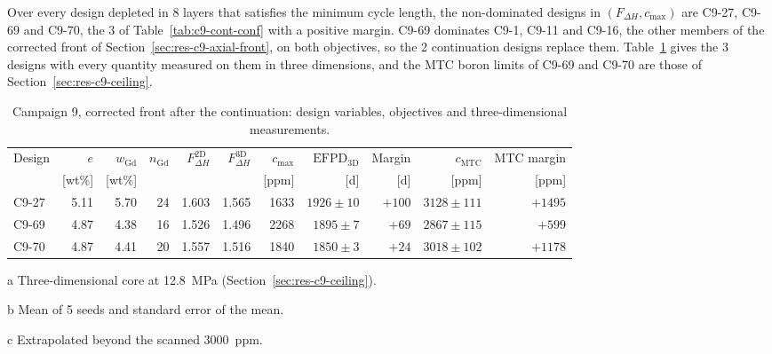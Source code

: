 Over every design depleted in 8 layers that satisfies the minimum cycle
length, the non-dominated designs in $(F_{\Delta H}, c_\mathrm{max})$
are C9-27, C9-69 and C9-70, the 3 of Table~\ref{tab:c9-cont-conf} with
a positive margin. C9-69 dominates C9-1, C9-11 and C9-16, the other
members of the corrected front of Section~\ref{sec:res-c9-axial-front},
on both objectives, so the 2 continuation designs replace them.
Table~\ref{tab:c9-final-front} gives the 3 designs with every quantity
measured on them in three dimensions, and the MTC boron limits of C9-69
and C9-70 are those of Section~\ref{sec:res-c9-ceiling}.

\begin{table}[htbp]
  \centering
  \footnotesize
  \begin{threeparttable}
  \caption{Campaign 9, corrected front after the continuation: design variables, objectives and three-dimensional measurements.}
  \label{tab:c9-final-front}
  \setlength{\tabcolsep}{3.6pt}
  \begin{tabular}{@{}lrrrrrrrrrr@{}}
    \toprule
    Design & $e$ & $w_\mathrm{Gd}$ & $n_\mathrm{Gd}$ & $F_{\Delta H}^\mathrm{2D}$ & $F_{\Delta H}^\mathrm{3D}$ & $c_\mathrm{max}$ & $\mathrm{EFPD}_\mathrm{3D}$ & Margin & $c_\mathrm{MTC}$\tnote{a} & MTC margin \\
     & [wt\%] & [wt\%] & & & & [ppm] & [d] & [d] & [ppm] & [ppm] \\
    \midrule
    C9-27 & 5.11 & 5.70 & 24 & 1.603 & 1.565 & 1633 & $1926 \pm 10$\tnote{b} & $+100$ & $3128 \pm 111$\tnote{c} & $+1495$ \\
    C9-69 & 4.87 & 4.38 & 16 & 1.526 & 1.496 & 2268 & $1895 \pm 7$ & $+69$  & $2867 \pm 115$ & $+599$ \\
    C9-70 & 4.87 & 4.41 & 20 & 1.557 & 1.516 & 1840 & $1850 \pm 3$\tnote{b} & $+24$ & $3018 \pm 102$\tnote{c} & $+1178$ \\
    \bottomrule
  \end{tabular}
  \begin{tablenotes}[flushleft]\footnotesize
    \item[a] Three-dimensional core at \SI{12.8}{MPa} (Section~\ref{sec:res-c9-ceiling}).
    \item[b] Mean of 5 seeds and standard error of the mean.
    \item[c] Extrapolated beyond the scanned \SI{3000}{ppm}.
  \end{tablenotes}
  \end{threeparttable}
\end{table}

